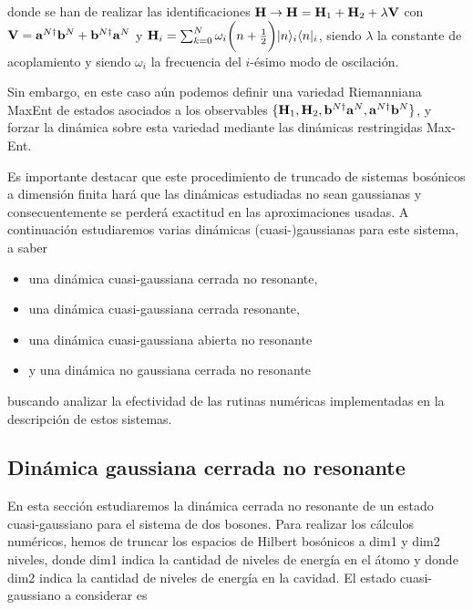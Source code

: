 \documentclass{report} %
\newcommand{\notamm}[1]{{\color{orange} [Comentario MM: #1]}}
\numberwithin{equation}{section}
\begin{document}
donde se han de realizar las identificaciones ${\bf H}\rightarrow  {\bf H}={ \bf H}_1 + { \bf H}_2 + \lambda {\bf V}$
con ${\bf V}={\bf a}^{N\dagger}{\bf b}^{N}+{\bf b}^{N\dagger}{\bf a}^{N}$ y
${\bf H}_i=\sum_{k=0}^{N}\omega_i \bigg(n+\frac{1}{2}\bigg)|n \rangle_i\langle n|_i$, siendo $\lambda$ la constante de acoplamiento y siendo $\omega_i$ la frecuencia del $i$-ésimo modo de oscilación.

Sin embargo, en este caso aún podemos definir una variedad Riemanniana MaxEnt de estados asociados a los observables  $\{{\bf H}_1,{\bf H}_2,{\bf b}^{N\dagger}{\bf a}^{N},{\bf a}^{N\dagger}{\bf b}^{N}\}$, y forzar la dinámica sobre esta variedad mediante las dinámicas restringidas Max-Ent. 

Es importante destacar que este procedimiento de truncado de sistemas bosónicos a dimensión finita hará que las dinámicas estudiadas no sean gaussianas y consecuentemente se perderá exactitud en las aproximaciones usadas. A continuación estudiaremos varias dinámicas (cuasi-)gaussianas para este sistema, a saber

\begin{itemize}
    \item una dinámica cuasi-gaussiana cerrada no resonante,
    \item una dinámica cuasi-gaussiana cerrada resonante,
    \item una dinámica cuasi-gaussiana abierta no resonante
    \item y una dinámica no gaussiana cerrada no resonante
\end{itemize}

buscando analizar la efectividad de las rutinas numéricas implementadas en la descripción de estos sistemas. 


\subsection{Dinámica gaussiana cerrada no resonante}
\label{bxb_c_nr_g}

En esta sección estudiaremos la dinámica cerrada no resonante de un estado cuasi-gaussiano para el sistema de dos bosones. Para realizar los cálculos numéricos, hemos de truncar los espacios de Hilbert bosónicos a dim1 y dim2 niveles, donde dim1 indica la cantidad de niveles de energía en el átomo y donde dim2 indica la cantidad de niveles de energía en la cavidad. 
El estado cuasi-gaussiano a considerar es 
\end{document}
